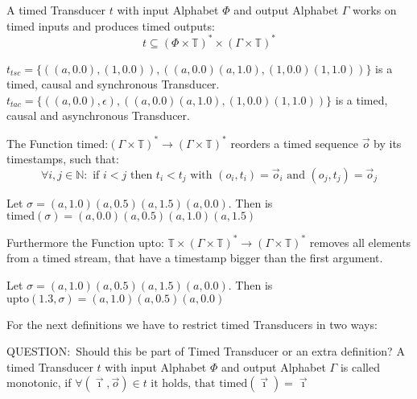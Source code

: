 \begin{definition}[name = Timed Transducer]\label{def:timed_transducer}
  A timed Transducer \(t\) with input Alphabet \(\Phi\) and output Alphabet \(\Gamma\) works on timed inputs and produces timed outputs:
  \[t \subseteq {\left(\Phi \times \mathbb{T}\right)}^* \times {\left(\Gamma \times \mathbb{T}\right)}^*\]
\end{definition}

\begin{exmp}[name=Timed Transducers]
  \(t_{tsc} = \{((a,0.0), (1,0.0)),((a,0.0)(a,1.0), (1,0.0)(1,1.0))\}\) is a timed, causal and synchronous Transducer.
  \(t_{tac} = \{((a,0.0), \epsilon),((a,0.0)(a,1.0), (1,0.0)(1,1.0))\}\) is a timed, causal and asynchronous Transducer.
\end{exmp}

The Function \(\text{timed:} {(\Gamma \times \mathbb{T})}^* \rightarrow {(\Gamma \times \mathbb{T})}^* \)
reorders a timed sequence \(\vec{o}\) by its timestamps, such that:
\[
  \forall i,j \in \mathbb{N}:\text{ if } i < j \text{ then } t_i < t_j \text{ with } (o_i, t_i) = \vec{o}_i \text{ and } (o_j, t_j) = \vec{o}_j
\]


\begin{exmp}[name=Timed Function]
  Let \(\sigma = (a,1.0)(a,0.5)(a,1.5)(a,0.0)\). Then is \(\text{timed}(\sigma) =(a,0.0)(a,0.5)(a,1.0)(a,1.5)\)
\end{exmp}

Furthermore the Function \(\text{upto: } \mathbb{T} \times {(\Gamma\times\mathbb{T})}^* \rightarrow {(\Gamma\times\mathbb{T})}^*\) removes all elements from a timed stream, that have a timestamp bigger than the first argument.
\begin{exmp}[name=Upto Function]
  Let \(\sigma = (a,1.0)(a,0.5)(a,1.5)(a,0.0)\). Then is \(\text{upto}(1.3,\sigma) = (a,1.0)(a,0.5)(a,0.0)\)
\end{exmp}

For the next definitions we have to restrict timed Transducers in two ways:

\begin{definition}[name = Monotonicity of Timed Transducers]\label{def:monotonicity_timed_transducer}
  QUESTION:\ Should this be part of Timed Transducer or an extra definition?
  A timed Transducer \(t\) with input Alphabet \(\Phi\) and output Alphabet \(\Gamma\) is called monotonic,
  if \(\forall (\vec{\imath}, \vec{o}) \in t \text{ it holds, that timed}(\vec{\imath}) = \vec{\imath} \)
\end{definition}

